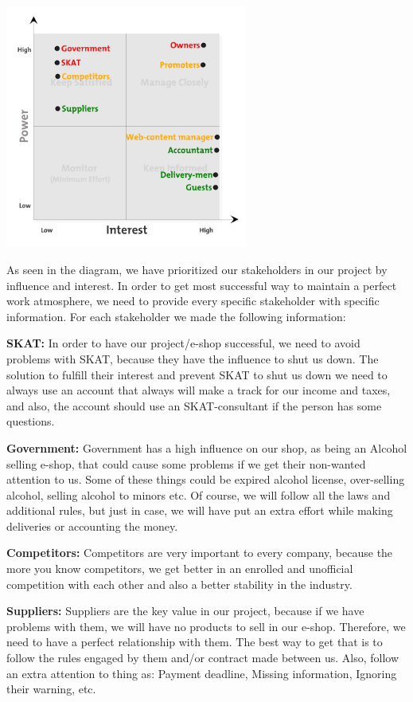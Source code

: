 \documentclass[12p]{article}
\begin{document}
\begin{center}
\includegraphics[width=0.6\textwidth]{stakeholder}
\end{center}

As seen in the diagram, we have prioritized our stakeholders in our project by influence and interest. In order to get most successful way to maintain a perfect work atmosphere, we need to provide every specific stakeholder with specific information. For each stakeholder we made the following information: 

\textbf{SKAT:}
In order to have our project/e-shop successful, we need to avoid problems with SKAT, because they have the influence to shut us down. The solution to fulfill their interest and prevent SKAT to shut us down we need to always use an account that always will make a track for our income and taxes, and also, the account should use an SKAT-consultant if the person has some questions.

\textbf{Government:}
Government has a high influence on our shop, as being an Alcohol selling e-shop, that could cause some problems if we get their non-wanted attention to us. Some of these things could be expired alcohol license, over-selling alcohol, selling alcohol to minors etc. Of course, we will follow all the laws and additional rules, but just in case, we will have put an extra effort while making deliveries or accounting the money.

\textbf{Competitors:}
Competitors are very important to every company, because the more you know competitors, we get better in an enrolled and unofficial competition with each other and also a better stability in the industry.

\textbf{Suppliers:}
Suppliers are the key value in our project, because if we have problems with them, we will have no products to sell in our e-shop. Therefore, we need to have a perfect relationship with them. The best way to get that is to follow the rules engaged by them and/or contract made between us. Also, follow an extra attention to thing as: Payment deadline, Missing information, Ignoring their warning, etc.
\end{document}
